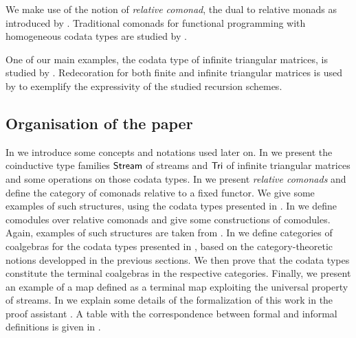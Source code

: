 \documentclass{amsart}
\begin{document}
 We make use of the notion of \emph{relative comonad}, the dual to relative monads as introduced by \textcite{DBLP:conf/fossacs/AltenkirchCU10}.
 Traditional comonads for functional programming with homogeneous codata types are studied by \textcite{DBLP:conf/sfp/UustaluV01}.
 
 One of our main examples, the codata type of infinite triangular matrices, is studied by \textcite{DBLP:conf/types/MatthesP11}.
 Redecoration for both finite and infinite triangular matrices is used by \textcite{DBLP:journals/tcs/AbelMU05} to exemplify 
 the expressivity of the studied recursion schemes.
 
 
 \subsection*{Organisation of the paper}
  In  we introduce some concepts and notations used later on.
  In  we present the coinductive type families $\mathsf{Stream}$ of streams and $\mathsf{Tri}$ of infinite triangular matrices and some operations on those
           codata types.
  In  we present \emph{relative comonads} and define the category of comonads relative to a fixed functor.
    We give some examples of such structures, using the codata types presented in .
  In  we define comodules over relative comonads and give some constructions of comodules.
     Again, examples of such structures are taken from .
  In  we define categories of coalgebras for the codata types presented in ,
      based on the category-theoretic notions developped in the previous sections.
      We then prove that the codata types constitute the terminal coalgebras in the respective categories.
      Finally, we present an example of a map defined as a terminal map exploiting the universal property of streams.
   In  we explain some details of the formalization of this work in the proof assistant \coq.
  A table with the correspondence between formal and informal definitions is given in .
 

%  
  
\end{document}
